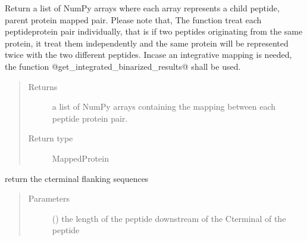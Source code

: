 \documentclass[letterpaper,10pt,english]{sphinxmanual}
\begin{document}
\begin{fulllineitems}
\begin{fulllineitems}
\begin{quote}
\begin{description}
\end{description}\end{quote}

\end{fulllineitems}


\begin{fulllineitems}
\label{\detokenize{IPTK.Classes:IPTK.Classes.Experiment.Experiment.get_binarized_results}}
Return a list of NumPy arrays where each array represents a child peptide, parent protein mapped pair.
Please note that, The function treat each peptide\sphinxhyphen{}protein pair individually, that is if two peptides originating from the same protein, 
it treat them independently and the same protein will be represented twice with the two different peptides. Incase an integrative mapping is needed,
the function @get\_integrated\_binarized\_results@ shall be used.
\begin{quote}\begin{description}
\item[{Returns}] \leavevmode
a list of NumPy arrays containing the mapping between each peptide protein pair.

\item[{Return type}] \leavevmode
MappedProtein

\end{description}\end{quote}

\end{fulllineitems}


\begin{fulllineitems}
\label{\detokenize{IPTK.Classes:IPTK.Classes.Experiment.Experiment.get_c_terminal_flanked_seqs}}
return the c\sphinxhyphen{}terminal flanking sequences
\begin{quote}\begin{description}
\item[{Parameters}] \leavevmode
{} () \textendash{} the length of the peptide downstream of the C\sphinxhyphen{}terminal of the peptide


\end{description}
\end{quote}
\end{fulllineitems}
\end{fulllineitems}
\end{document}
